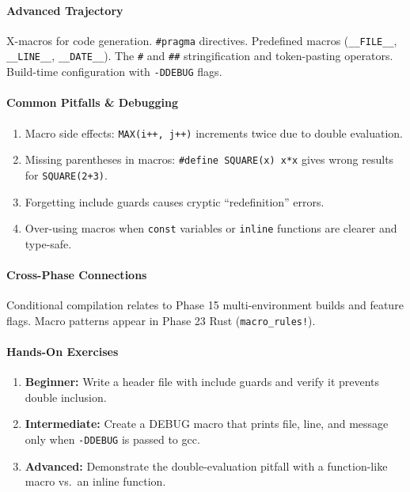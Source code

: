 \documentclass[11pt, a4paper, oneside]{report}
\begin{document}
\paragraph{Advanced Trajectory} X-macros for code generation. \texttt{\#pragma} directives. Predefined macros (\texttt{\_\_FILE\_\_}, \texttt{\_\_LINE\_\_}, \texttt{\_\_DATE\_\_}). The \texttt{\#} and \texttt{\#\#} stringification and token-pasting operators. Build-time configuration with \texttt{-DDEBUG} flags.

\paragraph{Common Pitfalls \& Debugging}
\begin{enumerate}[leftmargin=*]
\item Macro side effects: \texttt{MAX(i++, j++)} increments twice due to double evaluation.
\item Missing parentheses in macros: \texttt{\#define SQUARE(x) x*x} gives wrong results for \texttt{SQUARE(2+3)}.
\item Forgetting include guards causes cryptic ``redefinition'' errors.
\item Over-using macros when \texttt{const} variables or \texttt{inline} functions are clearer and type-safe.
\end{enumerate}

\paragraph{Cross-Phase Connections} Conditional compilation relates to Phase 15 multi-environment builds and feature flags. Macro patterns appear in Phase 23 Rust (\texttt{macro\_rules!}).

\paragraph{Hands-On Exercises}
\begin{enumerate}[leftmargin=*]
\item \textbf{Beginner:} Write a header file with include guards and verify it prevents double inclusion.
\item \textbf{Intermediate:} Create a DEBUG macro that prints file, line, and message only when \texttt{-DDEBUG} is passed to gcc.
\item \textbf{Advanced:} Demonstrate the double-evaluation pitfall with a function-like macro vs.\ an inline function.
\end{enumerate}
\end{document}
